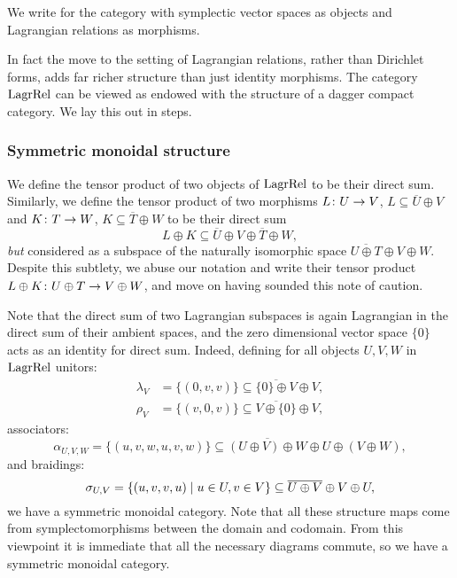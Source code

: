 \begin{definition}
  We write  for the category with symplectic
  vector spaces as objects and Lagrangian relations as morphisms. 
\end{definition}

In fact the move to the setting of Lagrangian relations, rather than Dirichlet
forms, adds far richer structure than just identity morphisms. The category
$\mathrm{LagrRel}$ can be viewed as endowed with the structure of a dagger
compact category. We lay this out in steps.

\subsubsection*{Symmetric monoidal structure}

We define the tensor product of two objects of $\mathrm{LagrRel}$ to be their
direct sum. Similarly, we define the tensor product of two morphisms $L{\colon} U
\to V$, $L \subseteq \overline{U}\oplus V$ and $K{\colon} T \to W$, $K \subseteq
\overline{T} \oplus W$ to be their direct sum
\[
  L \oplus K \subseteq \overline{U}\oplus V \oplus\overline{T} \oplus W,
\]
\emph{but} considered as a subspace of the naturally isomorphic space
$\overline{U \oplus T} \oplus V \oplus W$.  Despite this subtlety, we abuse our
notation and write their tensor product $L \oplus K{\colon} U \oplus T \to V \oplus
W$, and move on having sounded this note of caution. 

Note that the direct sum of two Lagrangian subspaces is
again Lagrangian in the direct sum of their ambient spaces, and the zero
dimensional vector space $\{0\}$ acts as an identity for direct sum. Indeed,
defining for all objects $U,V,W$ in $\mathrm{LagrRel}$ unitors: 
\begin{align*}
  \lambda_V &= \{(0,v,v)\} \subseteq \overline{\{0\} \oplus V} \oplus V, \\
  \rho_V &= \{(v,0,v)\} \subseteq \overline{V \oplus \{0\}} \oplus V,
\end{align*}
associators:
\[
  \alpha_{U,V,W}= \{(u,v,w,u,v,w)\} \subseteq \overline{(U \oplus V)\oplus W}
  \oplus U \oplus (V \oplus W),
\]
and braidings:
\[
  \sigma_{U,V} = \{(u,v,v,u) \mid u \in U, v \in V\} \subseteq \overline{U \oplus V}
  \oplus V \oplus U,
\]
we have a symmetric monoidal category.  Note that all these structure
maps come from symplectomorphisms between the domain and codomain. From this
viewpoint it is immediate that all the necessary diagrams commute, so we
have a symmetric monoidal category. 

